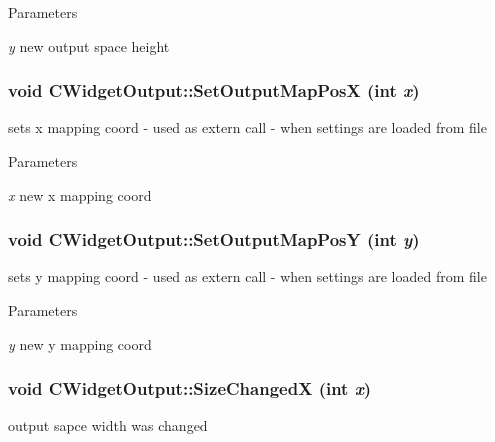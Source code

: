 \begin{DoxyParams}{Parameters}
\item[{\em y}]new output space height \end{DoxyParams}
\hypertarget{classCWidgetOutput_a585e2d0af4e9bb011634cd8202ac62bd}{
\subsubsection[{SetOutputMapPosX}]{\setlength{\rightskip}{0pt plus 5cm}void CWidgetOutput::SetOutputMapPosX (int {\em x})}}
\label{classCWidgetOutput_a585e2d0af4e9bb011634cd8202ac62bd}
sets x mapping coord -\/ used as extern call -\/ when settings are loaded from file


\begin{DoxyParams}{Parameters}
\item[{\em x}]new x mapping coord \end{DoxyParams}
\hypertarget{classCWidgetOutput_a51929359458a26fe65a655b35d3e7ed8}{
\subsubsection[{SetOutputMapPosY}]{\setlength{\rightskip}{0pt plus 5cm}void CWidgetOutput::SetOutputMapPosY (int {\em y})}}
\label{classCWidgetOutput_a51929359458a26fe65a655b35d3e7ed8}
sets y mapping coord -\/ used as extern call -\/ when settings are loaded from file


\begin{DoxyParams}{Parameters}
\item[{\em y}]new y mapping coord \end{DoxyParams}
\hypertarget{classCWidgetOutput_a9f9f4aec6fc63607de96aacd44d69d44}{
\subsubsection[{SizeChangedX}]{\setlength{\rightskip}{0pt plus 5cm}void CWidgetOutput::SizeChangedX (int {\em x})}}
\label{classCWidgetOutput_a9f9f4aec6fc63607de96aacd44d69d44}
output sapce width was changed


